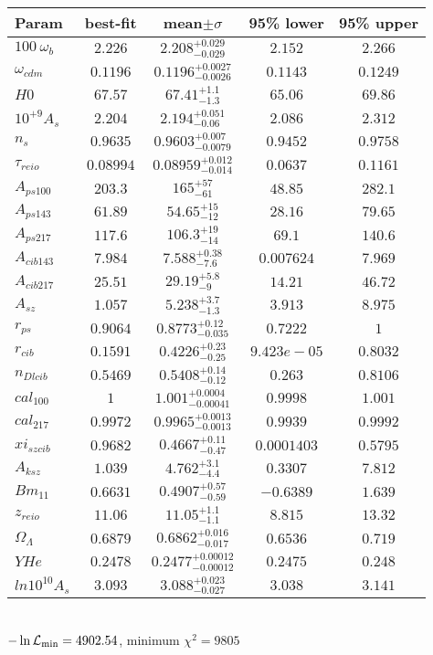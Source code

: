 \begin{tabular}{|l|c|c|c|c|} 
 \hline 
Param & best-fit & mean$\pm\sigma$ & 95\% lower & 95\% upper \\ \hline 
$100~\omega_{b }$ &$2.226$ & $2.208_{-0.029}^{+0.029}$ & $2.152$ & $2.266$ \\ 
$\omega_{cdm }$ &$0.1196$ & $0.1196_{-0.0026}^{+0.0027}$ & $0.1143$ & $0.1249$ \\ 
$H0$ &$67.57$ & $67.41_{-1.3}^{+1.1}$ & $65.06$ & $69.86$ \\ 
$10^{+9}A_{s }$ &$2.204$ & $2.194_{-0.06}^{+0.051}$ & $2.086$ & $2.312$ \\ 
$n_{s }$ &$0.9635$ & $0.9603_{-0.0079}^{+0.007}$ & $0.9452$ & $0.9758$ \\ 
$\tau_{reio }$ &$0.08994$ & $0.08959_{-0.014}^{+0.012}$ & $0.0637$ & $0.1161$ \\ 
$A_{ps 100 }$ &$203.3$ & $165_{-61}^{+57}$ & $48.85$ & $282.1$ \\ 
$A_{ps 143 }$ &$61.89$ & $54.65_{-12}^{+15}$ & $28.16$ & $79.65$ \\ 
$A_{ps 217 }$ &$117.6$ & $106.3_{-14}^{+19}$ & $69.1$ & $140.6$ \\ 
$A_{cib 143 }$ &$7.984$ & $7.588_{-7.6}^{+0.38}$ & $0.007624$ & $7.969$ \\ 
$A_{cib 217 }$ &$25.51$ & $29.19_{-9}^{+5.8}$ & $14.21$ & $46.72$ \\ 
$A_{sz }$ &$1.057$ & $5.238_{-1.3}^{+3.7}$ & $3.913$ & $8.975$ \\ 
$r_{ps }$ &$0.9064$ & $0.8773_{-0.035}^{+0.12}$ & $0.7222$ & $1$ \\ 
$r_{cib }$ &$0.1591$ & $0.4226_{-0.25}^{+0.23}$ & $9.423e-05$ & $0.8032$ \\ 
$n_{Dl cib }$ &$0.5469$ & $0.5408_{-0.12}^{+0.14}$ & $0.263$ & $0.8106$ \\ 
$cal_{100 }$ &$1$ & $1.001_{-0.00041}^{+0.0004}$ & $0.9998$ & $1.001$ \\ 
$cal_{217 }$ &$0.9972$ & $0.9965_{-0.0013}^{+0.0013}$ & $0.9939$ & $0.9992$ \\ 
$xi_{sz cib }$ &$0.9682$ & $0.4667_{-0.47}^{+0.11}$ & $0.0001403$ & $0.5795$ \\ 
$A_{ksz }$ &$1.039$ & $4.762_{-4.4}^{+3.1}$ & $0.3307$ & $7.812$ \\ 
$Bm_{1 1 }$ &$0.6631$ & $0.4907_{-0.59}^{+0.57}$ & $-0.6389$ & $1.639$ \\ 
$z_{reio }$ &$11.06$ & $11.05_{-1.1}^{+1.1}$ & $8.815$ & $13.32$ \\ 
$\Omega_{\Lambda }$ &$0.6879$ & $0.6862_{-0.017}^{+0.016}$ & $0.6536$ & $0.719$ \\ 
$YHe$ &$0.2478$ & $0.2477_{-0.00012}^{+0.00012}$ & $0.2475$ & $0.248$ \\ 
$ln10^{10}A_{s }$ &$3.093$ & $3.088_{-0.027}^{+0.023}$ & $3.038$ & $3.141$ \\ 
\hline 
 \end{tabular} \\ 
$-\ln{\cal L}_\mathrm{min} =4902.54$, minimum $\chi^2=9805$ \\ 
